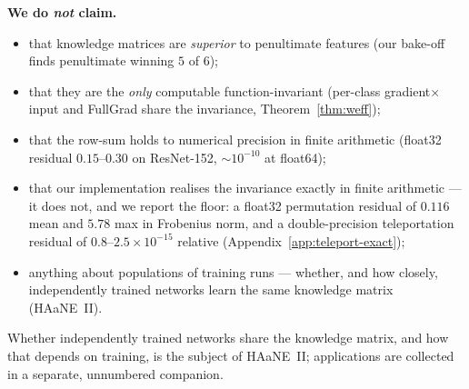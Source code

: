 \begin{tcolorbox}[breakable, colback=white, colframe=black, boxrule=0.4pt, sharp corners]
\smallskip
\textbf{We do \emph{not} claim.}
\begin{itemize}
\item that knowledge matrices are \emph{superior} to penultimate
features (our bake-off finds penultimate winning $5$ of $6$);
\item that they are the \emph{only} computable function-invariant
(per-class gradient$\times$input and FullGrad share the invariance,
Theorem~\ref{thm:weff});
\item that the row-sum holds to numerical precision in finite arithmetic
(float32 residual $0.15$--$0.30$ on ResNet-152, $\sim10^{-10}$ at
float64);
\item that our implementation realises the invariance exactly in finite
arithmetic --- it does not, and we report the floor: a float32 permutation
residual of $0.116$ mean and $5.78$ max in Frobenius norm, and a double-precision
teleportation residual of $0.8$--$2.5\times10^{-15}$ relative
(Appendix~\ref{app:teleport-exact});
\item anything about populations of training runs --- whether, and how
closely, independently trained networks learn the same knowledge matrix
(HAaNE~II).
\end{itemize}
Whether independently trained networks share the knowledge matrix, and
how that depends on training, is the subject of HAaNE~II; applications
are collected in a separate, unnumbered companion.
\end{tcolorbox}
